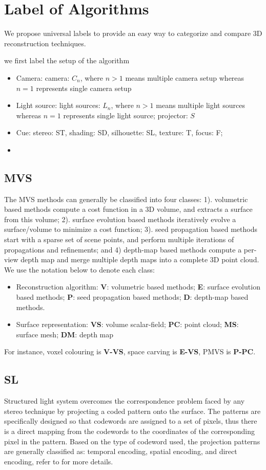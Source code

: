 \section{Label of Algorithms}
We propose universal labels to provide an easy way to categorize and compare 3D reconstruction techniques.

we first label the setup of the algorithm
\begin{itemize}
\item Camera: camera: $C_n$, where $n>1$ means multiple camera setup whereas $n=1$ represents single camera setup
\item Light source: light sources: $L_n$, where $n>1$ means multiple light sources whereas $n=1$ represents single light source; projector: $S$
\item Cue: stereo: ST, shading: SD, silhouette: SL, texture: T, focus: F;
\item 
\end{itemize}
\subsection{MVS}
The MVS methods can generally be classified into four classes: 1). volumetric based methods compute a cost function in a 3D volume, and extracts a surface from this volume; 2). surface evolution based methods iteratively evolve a surface/volume to minimize a cost function; 3). seed propagation based methods start with a sparse set of scene points, and perform multiple iterations of propagations and refinements; and 4) depth-map based methods compute a per-view depth map and merge multiple depth maps into a complete 3D point cloud. We use the notation below to denote each class:
\begin{itemize}
\item Reconstruction algorithm: \textbf{V}: volumetric based methods; \textbf{E}: surface evolution based methods; \textbf{P}: seed propagation based methods; \textbf{D}: depth-map based methods.
\item Surface representation: \textbf{VS}: volume scalar-field; \textbf{PC}: point cloud; \textbf{MS}: surface mesh; \textbf{DM}: depth map
\end{itemize}

For instance, voxel colouring is \textbf{V-VS}, space carving is \textbf{E-VS}, PMVS is \textbf{P-PC}.

\subsection{SL}
Structured light system overcomes the correspondence problem faced by any stereo technique by projecting a coded pattern onto the surface. The patterns are specifically designed so that codewords are assigned to a set of pixels, thus there is a direct mapping from the codewords to the coordinates of the corresponding pixel in the pattern. Based on the type of codeword used, the projection patterns are generally classified as: temporal encoding, spatial encoding, and direct encoding, refer to \cite{salvi2004pattern} for more details.

